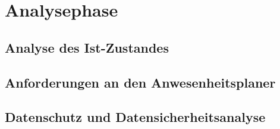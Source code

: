 \section{Analysephase}
\label{sec:Analysephase}

\subsection{Analyse des Ist-Zustandes}
\label{sec:Ist-Zustand}


\subsection{Anforderungen an den Anwesenheitsplaner}
\label{sec:Soll-Zustand}

\subsection{ Datenschutz und Datensicherheitsanalyse}
\label{sec:Datenschutz}
